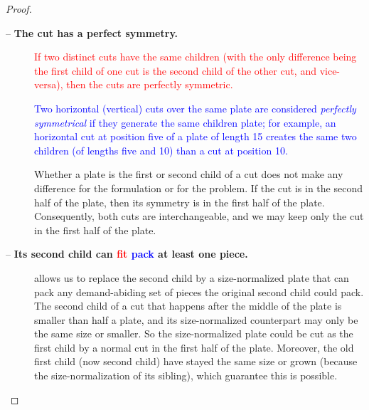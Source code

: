 \documentclass[ppgc,tese,english,formais,babel]{iiufrgs}
\newif\iffinalversion
\newcommand{\newtext}[1]{\iffinalversion%
#1%
\else%
\textcolor{blue}{#1}%
\fi%
}
\newcommand{\oldtext}[1]{\iffinalversion%
\else%
\textcolor{red}{#1}%
\fi%
}
\begin{document}
\begin{proof}
\begin{description}
\item[ -- \textbf{The cut has a perfect symmetry.}]
\oldtext{If two distinct cuts have the same children (with the only difference being the first child of one cut is the second child of the other cut, and vice-versa), then the cuts are perfectly symmetric.}
\newtext{Two horizontal (vertical) cuts over the same plate are considered \emph{perfectly symmetrical} if they generate the same children plate; for example, an horizontal cut at position five of a plate of length 15 creates the same two children (of lengths five and 10) than a cut at position 10.}
Whether a plate is the first or second child of a cut does not make any difference for the formulation or for the problem.
If the cut is in the second half of the plate, then its symmetry is in the first half of the plate.
Consequently, both cuts are interchangeable, and we may keep only the cut in the first half of the plate.
\item[ -- \textbf{Its second child can \oldtext{fit}\newtext{pack} at least one piece.}]
 allows us to replace the second child by a size-normalized plate that can pack any demand-abiding set of pieces the original second child could pack.
The second child of a cut that happens after the middle of the plate is smaller than half a plate, and its size-normalized counterpart may only be the same size or smaller.
So the size-normalized plate could be cut as the first child by a normal cut in the first half of the plate.
Moreover, the old first child (now second child) have stayed the same size or grown (because the size-normalization of its sibling), which guarantee this is possible.


\end{description}
\end{proof}
\end{document}
